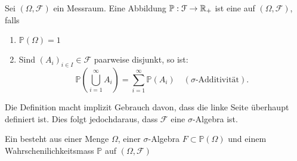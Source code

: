 \begin{definition}[Wahrscheinlichkeitsverteilung]\label{def:wahrscheinlichkeitsverteilung}
Sei $(\Omega, \mathcal{F})$ ein Messraum. Eine Abbildung $\mathbb{P} : \mathcal{F} \to  \mathbb{R}_+$ ist eine  auf $(\Omega, \mathcal{F})$, falls
    \begin{enumerate}[(1)]
        \item $\mathbb{P}(\Omega) = 1$
        \item Sind $(A_i)_{i \in I}\in \mathcal{F}$ paarweise disjunkt, so ist:
            \[
                \mathbb{P}\left( \bigcup_{i=1}^{\infty}A_i \right) = \sum_{i=1}^{\infty} \mathbb{P}(A_i) \quad (\sigma\text{-Additivität})
            .\] 
    \end{enumerate}
\end{definition}
\begin{remark*}
    Die Definition macht implizit Gebrauch davon, dass die linke Seite überhaupt definiert ist. Dies folgt jedochdaraus, dass $\mathcal{F}$ eine $\sigma$-Algebra ist.
\end{remark*}

\begin{definition}[Wahrscheinlichkeitsraum]\label{def:wahrscheinlichkeitsraum}
    Ein  besteht aus einer Menge $\Omega$, einer  $\sigma$-Algebra $F\subset \mathbb{P}\mathcal{(\Omega)}$ und einem Wahrschenilichkeitsmass $\mathbb{P}$ auf $(\Omega, \mathcal{F})$ 
\end{definition}


